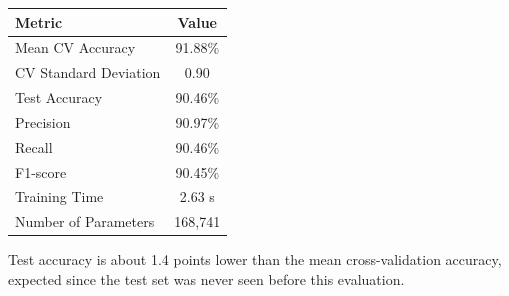 \documentclass[10pt]{article}
\begin{document}
\begin{center}
\begin{tabular}{|l|c|}
\hline
Metric & Value\\
\hline
Mean CV Accuracy & 91.88\%\\
CV Standard Deviation & 0.90\\
Test Accuracy & 90.46\%\\
Precision & 90.97\%\\
Recall & 90.46\%\\
F1-score & 90.45\%\\
Training Time & 2.63 s\\
Number of Parameters & 168,741\\
\hline
\end{tabular}
\end{center}

Test accuracy is about 1.4 points lower than the mean cross-validation accuracy, expected
since the test set was never seen before this evaluation.
\end{document}
